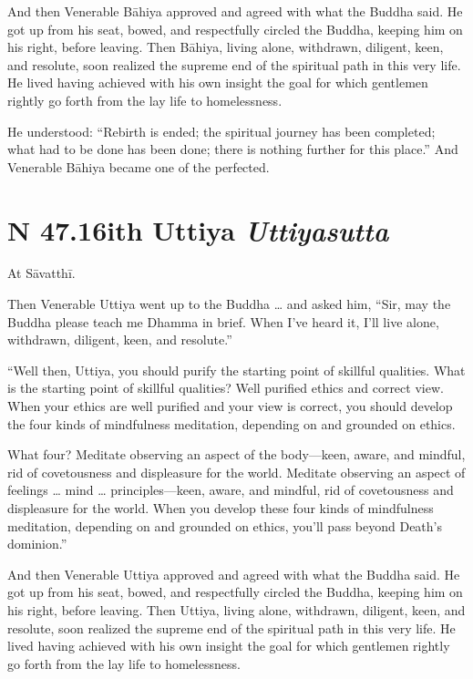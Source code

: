 \documentclass[12pt,openany]{book}%
\newcommand*{\suttatitleacronym}[1]{\smaller[2]{#1}\vspace*{.3em}}
\newcommand*{\suttatitletranslation}[1]{\linebreak{#1}}
\newcommand*{\suttatitleroot}[1]{\linebreak\smaller[2]\itshape{#1}}
\newcommand*{\tocacronym}[1]{\hspace*{-3.3em}{#1}\quad}
\newcommand*{\toctranslation}[1]{#1}
\newcommand*{\tocroot}[1]{(\textit{#1})}
\begin{document}
And then Venerable \textsanskrit{Bāhiya} approved and agreed with what the Buddha said. He got up from his seat, bowed, and respectfully circled the Buddha, keeping him on his right, before leaving. Then \textsanskrit{Bāhiya}, living alone, withdrawn, diligent, keen, and resolute, soon realized the supreme end of the spiritual path in this very life. He lived having achieved with his own insight the goal for which gentlemen rightly go forth from the lay life to homelessness. 

He understood: “Rebirth is ended; the spiritual journey has been completed; what had to be done has been done; there is nothing further for this place.” And Venerable \textsanskrit{Bāhiya} became one of the perfected. 

%
\section*{{\suttatitleacronym SN 47.16}{\suttatitletranslation With Uttiya }{\suttatitleroot Uttiyasutta}}
\addcontentsline{toc}{section}{\tocacronym{SN 47.16} \toctranslation{With Uttiya } \tocroot{Uttiyasutta}}

At \textsanskrit{Sāvatthī}. 

Then Venerable Uttiya went up to the Buddha … and asked him, “Sir, may the Buddha please teach me Dhamma in brief. When I’ve heard it, I’ll live alone, withdrawn, diligent, keen, and resolute.” 

“Well then, Uttiya, you should purify the starting point of skillful qualities. What is the starting point of skillful qualities? Well purified ethics and correct view. When your ethics are well purified and your view is correct, you should develop the four kinds of mindfulness meditation, depending on and grounded on ethics. 

What four? Meditate observing an aspect of the body—keen, aware, and mindful, rid of covetousness and displeasure for the world. Meditate observing an aspect of feelings … mind … principles—keen, aware, and mindful, rid of covetousness and displeasure for the world. When you develop these four kinds of mindfulness meditation, depending on and grounded on ethics, you’ll pass beyond Death’s dominion.” 

And then Venerable Uttiya approved and agreed with what the Buddha said. He got up from his seat, bowed, and respectfully circled the Buddha, keeping him on his right, before leaving. Then Uttiya, living alone, withdrawn, diligent, keen, and resolute, soon realized the supreme end of the spiritual path in this very life. He lived having achieved with his own insight the goal for which gentlemen rightly go forth from the lay life to homelessness. 
\end{document}
